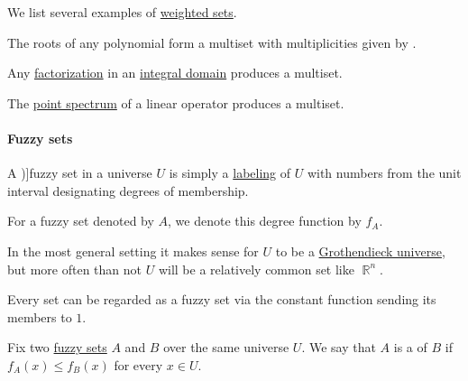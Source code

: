 \begin{example}\label{ex:def:multiset}
  We list several examples of \hyperref[def:labeled_set]{weighted sets}.

  \begin{itemize}
     The roots of any polynomial form a multiset with multiplicities given by .

     Any \hyperref[def:irreducible_factorization]{factorization} in an \hyperref[def:integral_domain]{integral domain} produces a multiset.

     The \hyperref[def:eigenpair]{point spectrum} of a linear operator produces a multiset.
  \end{itemize}
\end{example}

\paragraph{Fuzzy sets}

\begin{definition}\label{def:fuzzy_set}
  A \term[ru=нечёткое множество (\cite[27]{БогомоловСалий1997ДискретныеСистемы})]{fuzzy set} in a universe \( U \) is simply a \hyperref[def:labeled_set]{labeling} of \( U \) with numbers from the unit interval designating degrees of membership.

  For a fuzzy set denoted by \( A \), we denote this degree function by \( f_A \).
\end{definition}
\begin{comments}
  \item In the most general setting it makes sense for \( U \) to be a \hyperref[def:grothendieck_universe]{Grothendieck universe}, but more often than not \( U \) will be a relatively common set like \( \BbbR^n \).

  \item Every set can be regarded as a fuzzy set via the constant function sending its members to \( 1 \).
\end{comments}

\begin{definition}\label{def:fuzzy_subset}
  Fix two \hyperref[def:fuzzy_set]{fuzzy sets} \( A \) and \( B \) over the same universe \( U \). We say that \( A \) is a  of \( B \) if \( f_A(x) \leq f_B(x) \) for every \( x \in U \).
\end{definition}

